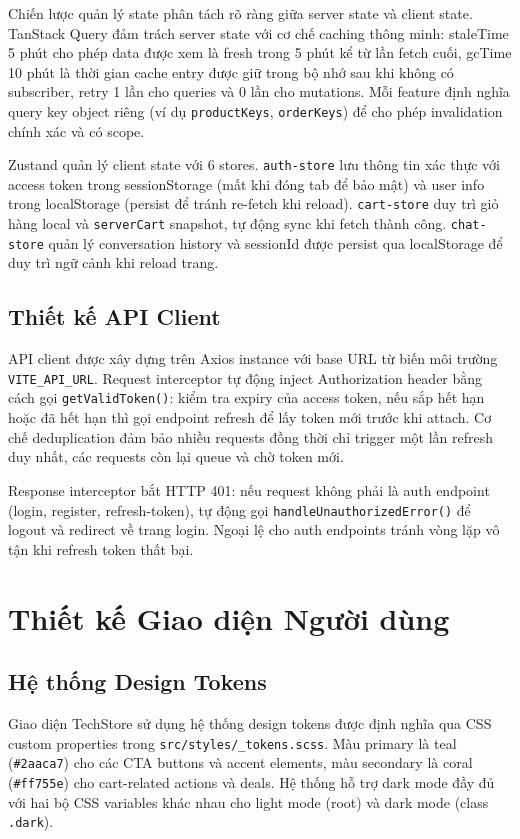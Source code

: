 Chiến lược quản lý state phân tách rõ ràng giữa server state và client state. TanStack Query đảm trách server state với cơ chế caching thông minh: staleTime 5 phút cho phép data được xem là fresh trong 5 phút kể từ lần fetch cuối, gcTime 10 phút là thời gian cache entry được giữ trong bộ nhớ sau khi không có subscriber, retry 1 lần cho queries và 0 lần cho mutations. Mỗi feature định nghĩa query key object riêng (ví dụ \texttt{productKeys}, \texttt{orderKeys}) để cho phép invalidation chính xác và có scope.

Zustand quản lý client state với 6 stores. \texttt{auth-store} lưu thông tin xác thực với access token trong sessionStorage (mất khi đóng tab để bảo mật) và user info trong localStorage (persist để tránh re-fetch khi reload). \texttt{cart-store} duy trì giỏ hàng local và \texttt{serverCart} snapshot, tự động sync khi fetch thành công. \texttt{chat-store} quản lý conversation history và sessionId được persist qua localStorage để duy trì ngữ cảnh khi reload trang.

\subsection{Thiết kế API Client}

API client được xây dựng trên Axios instance với base URL từ biến môi trường \texttt{VITE\_API\_URL}. Request interceptor tự động inject Authorization header bằng cách gọi \texttt{getValidToken()}: kiểm tra expiry của access token, nếu sắp hết hạn hoặc đã hết hạn thì gọi endpoint refresh để lấy token mới trước khi attach. Cơ chế deduplication đảm bảo nhiều requests đồng thời chỉ trigger một lần refresh duy nhất, các requests còn lại queue và chờ token mới.

Response interceptor bắt HTTP 401: nếu request không phải là auth endpoint (login, register, refresh-token), tự động gọi \texttt{handleUnauthorizedError()} để logout và redirect về trang login. Ngoại lệ cho auth endpoints tránh vòng lặp vô tận khi refresh token thất bại.

\section{Thiết kế Giao diện Người dùng}

\subsection{Hệ thống Design Tokens}

Giao diện TechStore sử dụng hệ thống design tokens được định nghĩa qua CSS custom properties trong \texttt{src/styles/\_tokens.scss}. Màu primary là teal (\texttt{\#2aaca7}) cho các CTA buttons và accent elements, màu secondary là coral (\texttt{\#ff755e}) cho cart-related actions và deals. Hệ thống hỗ trợ dark mode đầy đủ với hai bộ CSS variables khác nhau cho light mode (root) và dark mode (class \texttt{.dark}).

